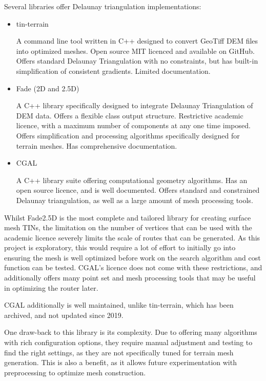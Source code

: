\documentclass[12pt]{article}
\begin{document}
Several libraries offer Delaunay triangulation implementations:

\begin{itemize}

  \item tin-terrain

        A command line tool written in C++ designed to convert GeoTiff DEM files into optimized meshes. Open source MIT licenced and available on GitHub. Offers standard Delaunay Triangulation with no constraints, but has built-in simplification of consistent gradients. Limited documentation.

  \item Fade (2D and 2.5D)

        A C++ library specifically designed to integrate Delaunay Triangulation of DEM data. Offers a flexible class output structure. Restrictive academic licence, with a maximum number of components at any one time imposed. Offers simplification and processing algorithms specifically designed for terrain meshes. Has comprehensive documentation.

  \item CGAL

        A C++ library suite offering computational geometry algorithms. Has an open source licence, and is well documented. Offers standard and constrained Delaunay triangulation, as well as a large amount of mesh processing tools.

\end{itemize}

Whilst Fade2.5D is the most complete and tailored library for creating surface mesh TINs, the limitation on the number of vertices that can be used with the academic licence severely limits the scale of routes that can be generated. As this project is exploratory, this would require a lot of effort to initially go into ensuring the mesh is well optimized before work on the search algorithm and cost function can be tested. CGAL's licence does not come with these restrictions, and additionally offers many point set and mesh processing tools that may be useful in optimizing the router later.

CGAL additionally is well maintained, unlike tin-terrain, which has been archived, and not updated since 2019.

One draw-back to this library is its complexity. Due to offering many algorithms with rich configuration options, they require manual adjustment and testing to find the right settings, as they are not specifically tuned for terrain mesh generation. This is also a benefit, as it allows future experimentation with preprocessing to optimize mesh construction.
\end{document}
